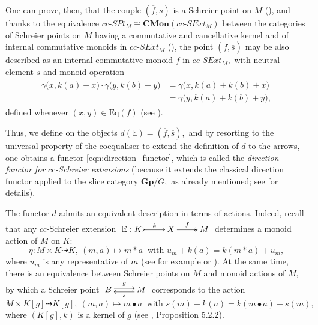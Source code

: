 \documentclass[a4paper]{amsart}
\theoremstyle{plain}
\theoremstyle{definition}
\theoremstyle{remark}
\begin{document}
One can prove, then, that the couple $(\overline{f},\overline{s})$ is a Schreier point on $M$ (\cite[Proposition 6.3]{AMR}), and thanks to the equivalence $cc\text{-}SPt_M\cong\mathbf{CMon}(cc\text{-}SExt_M)$ between the categories of Schreier points on $M$ having a commutative and cancellative kernel and of internal commutative monoids in $cc\text{-}SExt_M$ (\cite[Theorem 6.5]{AMR}), the point $(\overline{f},\overline{s})$ may be also described as an internal commutative monoid $\overline{f}$ in $cc\text{-}SExt_M,$ with neutral element $\overline{s}$ and monoid operation
\begin{equation}
\label{eqn:monoid_operation_on_direction}
\begin{aligned}
\begin{split}
\gamma\big(x,k(a)+x\big)\cdot\gamma\big(y,k(b)+y\big)&=\gamma\big(x,k(a)+k(b)+x\big)\\
&=\gamma\big(y,k(a)+k(b)+y\big),
\end{split}
\end{aligned}
\end{equation}
defined whenever $(x,y)\in\mathrm{Eq}(f)$ (see \cite[Corollary 6.8]{AMR}).

Thus, we define on the objects $d(\mathbb{E})=(\overline{f},\overline{s}),$ and by resorting to the universal property of the coequaliser to extend the definition of $d$ to the arrows, one obtains a functor \eqref{eqn:direction_functor}, which is called the \emph{direction functor for} $cc$\emph{-Schreier extensions} (because it extends the classical direction functor \cite{bourn-direction} applied to the slice category $\mathbf{Gp}/G,$ as already mentioned; see \cite{AMR} for details).

The functor $d$ admits an equivalent description in terms of actions. Indeed, recall that any $cc$-Schreier extension $\xymatrix{{\mathbb{E}:K} \ar@{>->}[r]^-{k} &X \ar@{->>}[r]^-{f} &M}$ determines a monoid action of $M$ on $K$:
\begin{equation}
\label{eqn:action_induced_by_Schreier_ext}
\eta\colon M\times K\dashrightarrow K, \ (m,a)\mapsto m\ast a \ \text{ with } u_m+k(a)=k(m\ast a)+u_m,
\end{equation}
where $u_m$ is any representative of $m$ (see for example \cite[Remark 4.20]{P-II} or \cite[Section 3]{AMR}). At the same time, there is an equivalence between Schreier points on $M$ and monoid actions of $M,$ by which a Schreier point $\xymatrix{B \ar@<.5ex>[r]^-g &M \ar@<.5ex>[l]^-s}$ corresponds to the action
\begin{equation}
\label{eqn:action_induced_by_Schreier_point}
M\times K[g]\dashrightarrow K[g], \ (m,a)\mapsto m\bullet a \ \text{ with } s(m)+k(a)=k(m\bullet a)+s(m),
\end{equation}
where $(K[g],k)$ is a kernel of $g$ (see \cite{schreier_book}, Proposition 5.2.2).
\end{document}
